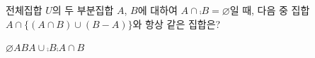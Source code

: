 전체집합 $U$의 두 부분집합 $A$, $B$에 대하여 $A\cap\comp{B}=\varnothing$일 때, 다음 중 집합 $A\cap\{(A\cap B)\cup(B-A)\}$와 항상 같은 집합은?
\begin{choices32}{$\varnothing$}{$A$}{$B$}{$A\cup\comp{B}$}{$\comp{A}\cap B$}\end{choices32}
